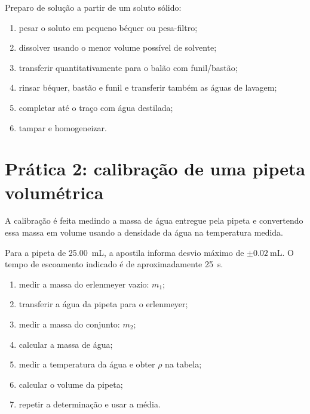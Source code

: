 \documentclass[a4paper,12pt]{article}
\begin{document}
\begin{procedimento}
Preparo de solução a partir de um soluto sólido:
\begin{enumerate}[leftmargin=1.7em]
    \item pesar o soluto em pequeno béquer ou pesa-filtro;
    \item dissolver usando o menor volume possível de solvente;
    \item transferir quantitativamente para o balão com funil/bastão;
    \item rinsar béquer, bastão e funil e transferir também as águas de lavagem;
    \item completar até o traço com água destilada;
    \item tampar e homogeneizar.
\end{enumerate}
\end{procedimento}

\section{Prática 2: calibração de uma pipeta volumétrica}

A calibração é feita medindo a massa de água entregue pela pipeta e convertendo essa massa em volume usando a densidade da água na temperatura medida.

Para a pipeta de \SI{25.00}{\milli\liter}, a apostila informa desvio máximo de
$\pm\SI{0.02}{\milli\liter}$. O tempo de escoamento indicado é de aproximadamente \SI{25}{\second}.

\begin{procedimento}
\begin{enumerate}[leftmargin=1.7em]
    \item medir a massa do erlenmeyer vazio: $m_1$;
    \item transferir a água da pipeta para o erlenmeyer;
    \item medir a massa do conjunto: $m_2$;
    \item calcular a massa de água;
    \item medir a temperatura da água e obter $\rho$ na tabela;
    \item calcular o volume da pipeta;
    \item repetir a determinação e usar a média.
\end{enumerate}
\end{procedimento}
\end{document}
